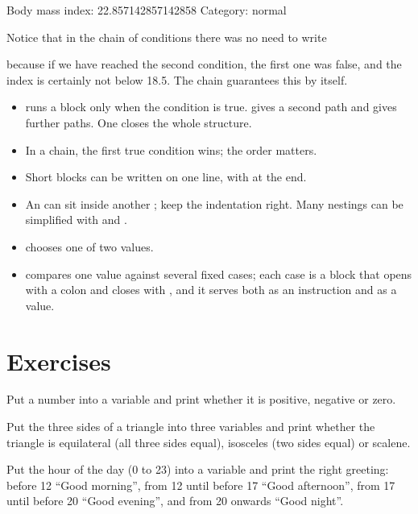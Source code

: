 \begin{salamout}
Body mass index: 22.857142857142858
Category: normal
\end{salamout}

Notice that in the chain of conditions there was no need to write
\begin{center}\end{center}
because if we have reached the second condition, the first one was false,
and the index is certainly not below 18.5. The chain guarantees this by
itself.

\begin{summary}
\begin{itemize}
  \item {} runs a block only when the condition is true.
         gives a second path and  gives
        further paths. One  closes the whole structure.
  \item In a chain, the first true condition wins; the order matters.
  \item Short blocks can be written on one line, with  at the
        end.
  \item An  can sit inside another ; keep the
        indentation right. Many nestings can be simplified with
         and .
  \item {} chooses one of two values.
  \item {} compares one value against several fixed cases; each
        case is a block that opens with a colon and closes with ,
        and it serves both as an instruction and as a value.
\end{itemize}
\end{summary}

\section*{Exercises}

\exercise Put a number into a variable and print whether it is positive,
negative or zero.

\exercise Put the three sides of a triangle into three variables and print
whether the triangle is equilateral (all three sides equal), isosceles (two
sides equal) or scalene.

\exercise Put the hour of the day (0 to 23) into a variable and print the
right greeting: before 12 ``Good morning'', from 12 until before 17 ``Good
afternoon'', from 17 until before 20 ``Good evening'', and from 20 onwards
``Good night''.

